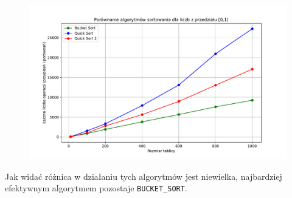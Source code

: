 \documentclass{article}
\begin{document}
 \begin{figure}[H]
 	\centering
 	\includegraphics[width=1\textwidth]{wykres.3.pdf}
 \end{figure}
 Jak widać różnica w działaniu tych algorytmów jest niewielka, najbardziej efektywnym algorytmem pozostaje \texttt{BUCKET\_SORT}. 

	
	
\end{document}

